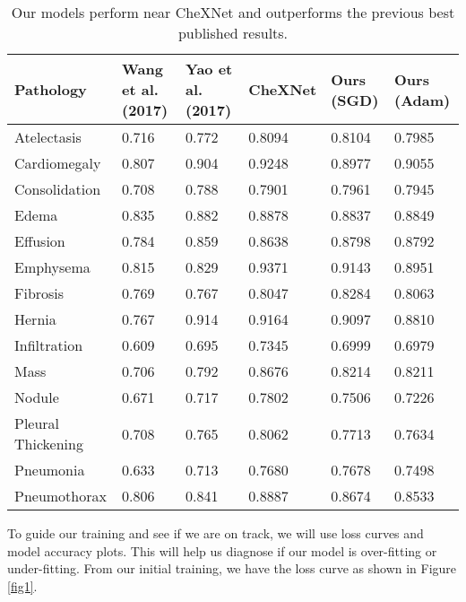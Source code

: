 \documentclass{amia}
\begin{document}
\begin{table}[]
\begin{tabular}{p{3cm}|p{2cm}|p{2cm}|p{2cm}|p{2cm}|p{2cm}}
\toprule
Pathology          & Wang et al. (2017) & Yao et al. (2017) & CheXNet & Ours (SGD) & Ours (Adam) \\ \midrule
Atelectasis        & 0.716              & 0.772             & 0.8094  & 0.8104     & 0.7985      \\
Cardiomegaly       & 0.807              & 0.904             & 0.9248  & 0.8977     & 0.9055      \\
Consolidation      & 0.708              & 0.788             & 0.7901  & 0.7961     & 0.7945      \\
Edema              & 0.835              & 0.882             & 0.8878  & 0.8837     & 0.8849      \\
Effusion           & 0.784              & 0.859             & 0.8638  & 0.8798     & 0.8792      \\
Emphysema          & 0.815              & 0.829             & 0.9371  & 0.9143     & 0.8951      \\
Fibrosis           & 0.769              & 0.767             & 0.8047  & 0.8284     & 0.8063      \\
Hernia             & 0.767              & 0.914             & 0.9164  & 0.9097     & 0.8810      \\
Infiltration       & 0.609              & 0.695             & 0.7345  & 0.6999     & 0.6979      \\
Mass               & 0.706              & 0.792             & 0.8676  & 0.8214     & 0.8211      \\
Nodule             & 0.671              & 0.717             & 0.7802  & 0.7506     & 0.7226      \\
Pleural Thickening & 0.708              & 0.765             & 0.8062  & 0.7713     & 0.7634      \\
Pneumonia          & 0.633              & 0.713             & 0.7680  & 0.7678     & 0.7498      \\
Pneumothorax       & 0.806              & 0.841             & 0.8887  & 0.8674     & 0.8533      \\ \bottomrule
\end{tabular}
\caption{Our models perform near CheXNet and outperforms the previous best published results.}
\end{table}


To guide our training and see if we are on track, we will use loss curves and model accuracy plots. This will help us diagnose if our model is over-fitting or under-fitting. From our initial training, we have the loss curve as shown in Figure \ref{fig1}.
\end{document}
